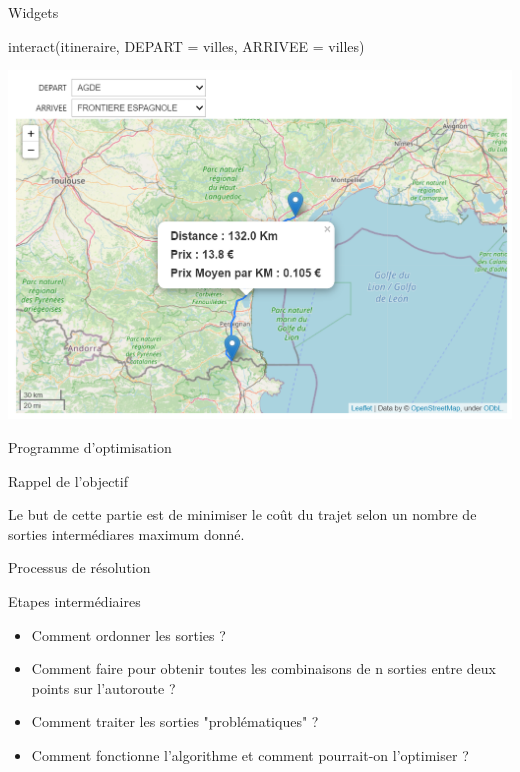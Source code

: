 \documentclass[aspectratio=169]{beamer}
\begin{document}
\begin{frame}{Widgets}

 \begin{block}{}
  {\color{blue} interact(itineraire, DEPART = villes, ARRIVEE = villes) } 
 \end{block} 

\begin{center}
 \includegraphics[scale=0.45]{Carte-1.png}
\end{center}
\end{frame}
\begin{frame}[fragile]{Programme d'optimisation}
  
\begin{block}{Rappel de l'objectif}

Le but de cette partie est de minimiser le coût du trajet selon un nombre de sorties intermédiares maximum donné. 
\end{block}

\end{frame}

\begin{frame}[fragile]{Processus de résolution}
\begin{block}{Etapes intermédiaires}
 

\begin{itemize}
    \item Comment ordonner les sorties ?
    \item Comment faire pour obtenir toutes les combinaisons de n sorties entre deux points sur l’autoroute ?
    \item Comment traiter les sorties "problématiques" ?
    \item Comment fonctionne l’algorithme et comment pourrait-on l’optimiser ?
\end{itemize}

\end{block}

\end{frame}
\end{document}
